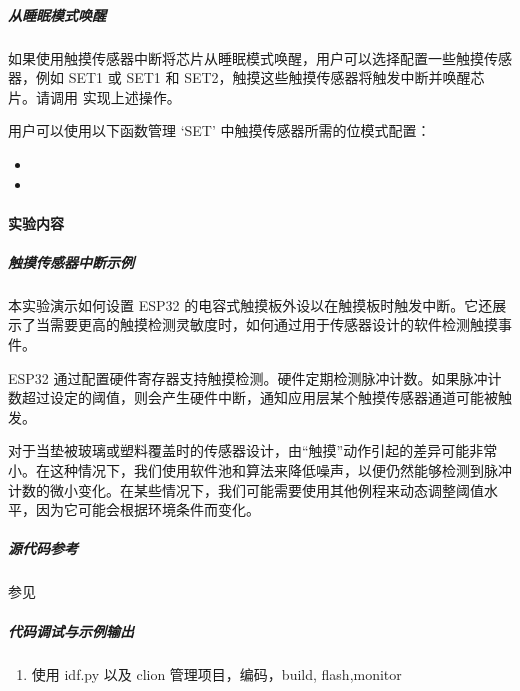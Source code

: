 \documentclass[a4paper,12pt,english]{sphinxmanual}
\begin{document}
{{\subparagraph{从睡眠模式唤醒}
\label{\detokenize{exp-esp32/peripherals/touch:id9}}
\sphinxAtStartPar
如果使用触摸传感器中断将芯片从睡眠模式唤醒，用户可以选择配置一些触摸传感器，例如 SET1 或 SET1 和 SET2，触摸这些触摸传感器将触发中断并唤醒芯片。请调用 实现上述操作。

\sphinxAtStartPar
用户可以使用以下函数管理 ‘SET’ 中触摸传感器所需的位模式配置：
\begin{itemize}
\item {} 
\sphinxAtStartPar
{}

\item {} 
\sphinxAtStartPar
{}

\end{itemize}


\paragraph{实验内容}
\label{\detokenize{exp-esp32/peripherals/touch:id10}}

\subparagraph{触摸传感器中断示例}
\label{\detokenize{exp-esp32/peripherals/touch:id11}}
\sphinxAtStartPar
本实验演示如何设置 ESP32 的电容式触摸板外设以在触摸板时触发中断。它还展示了当需要更高的触摸检测灵敏度时，如何通过用于传感器设计的软件检测触摸事件。

\sphinxAtStartPar
ESP32 通过配置硬件寄存器支持触摸检测。硬件定期检测脉冲计数。如果脉冲计数超过设定的阈值，则会产生硬件中断，通知应用层某个触摸传感器通道可能被触发。

\sphinxAtStartPar
对于当垫被玻璃或塑料覆盖时的传感器设计，由“触摸”动作引起的差异可能非常小。在这种情况下，我们使用软件池和算法来降低噪声，以便仍然能够检测到脉冲计数的微小变化。在某些情况下，我们可能需要使用其他例程来动态调整阈值水平，因为它可能会根据环境条件而变化。


\subparagraph{源代码参考}
\label{\detokenize{exp-esp32/peripherals/touch:id12}}
\sphinxAtStartPar
参见{\hyperref[\detokenize{reference::doc}]{}}


\subparagraph{代码调试与示例输出}
\label{\detokenize{exp-esp32/peripherals/touch:id13}}\begin{enumerate}
%
\item {} 
\sphinxAtStartPar
使用 idf.py 以及 clion 管理项目，编码，build, flash,monitor


\end{enumerate}}}
\end{document}
